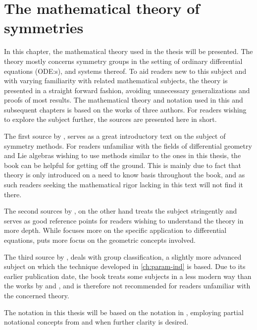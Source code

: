 \chapter{The mathematical theory of symmetries}

In this chapter, the mathematical theory used in the thesis will be presented.
The theory mostly concerns symmetry groups in the setting of ordinary differential equations (ODE:s), and systems thereof.
To aid readers new to this subject and with varying familiarity with related mathematical subjects, the theory is presented in a straight forward fashion, avoiding unnecessary generalizations and proofs of most results.
The mathematical theory and notation used in this and subsequent chapters is based on the works of three authors.
For readers wishing to explore the subject further, the sources are presented here in short.

The first source \cite{hydon2000symmetry} by \citeauthor{hydon2000symmetry}, serves as a great introductory text on the subject of symmetry methods.
For readers unfamiliar with the fields of differential geometry and Lie algebras wishing to use methods similar to the ones in this thesis, the book can be helpful for getting off the ground.
This is mainly due to fact that theory is only introduced on a need to know basis throughout the book, and as such readers seeking the mathematical rigor lacking in this text will not find it there.

The second sources \cite{olver1993applications,olver1995equivalence} by \citeauthor{olver1993applications}, on the other hand treats the subject stringently and serves as good reference points for readers wishing to understand the theory in more depth.
While \cite{olver1993applications} focuses more on the specific application to differential equations, \cite{olver1995equivalence} puts more focus on the geometric concepts involved.

The third source \cite{ovsiannikov1982group} by \citeauthor{ovsiannikov1982group}, deals with group classification, a slightly more advanced subject on which the technique developed in \cref{ch:param-ind} is based. %
Due to its earlier publication date, the book treats some subjects in a less modern way than the works by \citeauthor{hydon2000symmetry} and \citeauthor{olver1993applications}, and is therefore not recommended for readers unfamiliar with the concerned theory.

The notation in this thesis will be based on the notation in \cite{hydon2000symmetry}, employing partial notational concepts from \cite{olver1995equivalence} and \cite{ovsiannikov1982group} when further clarity is desired.

